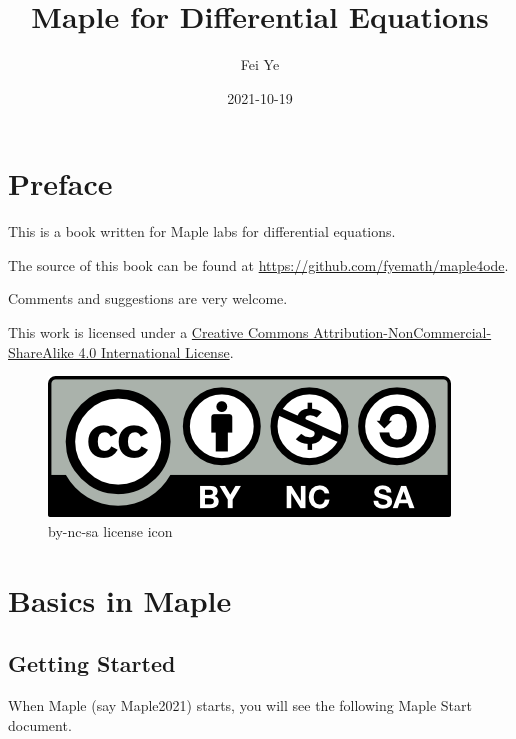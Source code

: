 \documentclass[
  12pt]{elegantbook}
\institute{QCC-CUNY}
\title{Maple for Differential Equations}
\author{Fei Ye}
\date{2021-10-19}
\begin{document}
\maketitle

{
\setcounter{tocdepth}{0}
\tableofcontents
}
\mainmatter

\hypersetup{pageanchor=true}

\captionsetup[figure]{labelformat=empty}
\captionsetup[subfigure]{labelformat=empty}

\hypertarget{preface}{%
\chapter*{Preface}\label{preface}}

This is a book written for Maple labs for differential equations.

The source of this book can be found at \url{https://github.com/fyemath/maple4ode}.

Comments and suggestions are very welcome.

This work is licensed under a \href{https://creativecommons.org/licenses/by-nc-sa/4.0/}{Creative Commons Attribution-NonCommercial-ShareAlike 4.0 International License}.

\begin{figure}
\centering
\includegraphics{figs/by-nc-sa.png}
\caption{by-nc-sa license icon}
\end{figure}

\hypertarget{basics-in-maple}{%
\chapter{Basics in Maple}\label{basics-in-maple}}

\hypertarget{getting-started}{%
\section{Getting Started}\label{getting-started}}

When Maple (say Maple2021) starts, you will see the following Maple Start document.
\end{document}
